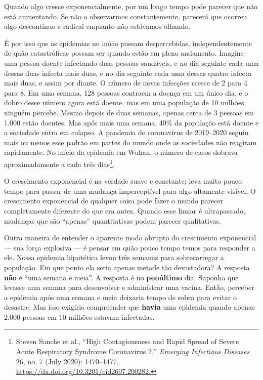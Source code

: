 Quando algo cresce exponencialmente, por um longo tempo pode parecer que não 
está aumentando. Se não o observarmos constantemente, parecerá que ocorreu algo
descontínuo e radical enquanto não estávamos olhando.

É por isso que as epidemias no início passam despercebidas, independentemente de
quão catastróficas possam ser quando estão em pleno andamento. Imagine uma
pessoa doente infectando duas pessoas saudáveis, e no dia seguinte cada uma
dessas duas infecta mais duas, e no dia seguinte cada uma dessas quatro infecta 
mais duas, e assim por diante. O número de novas infecções cresce de 2 para 4 
para 8. Em uma semana, 128 pessoas contraem a doença em um único dia, e o dobro 
desse número agora está doente, mas em uma população de 10 milhões, ninguém 
percebe. Mesmo depois de duas semanas, apenas cerca de 3 pessoas em 1.000 estão 
doentes. Mas após mais uma semana, 40\% da população está doente e a sociedade 
entra em colapso. A pandemia de coronavírus de 2019--2020 seguiu mais ou menos 
esse padrão em partes do mundo onde as sociedades não reagiram rapidamente. No 
início da epidemia em Wuhan, o número de casos dobrava aproximadamente a cada 
três dias\footnote{Steven Sanche et al., ``High Contagiousness and Rapid Spread
of Severe Acute Respiratory Syndrome Coronavirus 2,'' \textit{Emerging
Infectious Diseases} 26, no. 7 (July 2020): 1470--1477,
\url{https://dx.doi.org/10.3201/eid2607.200282.}}.

O crescimento exponencial é na verdade suave e constante; leva muito pouco 
tempo para passar de uma mudança imperceptível para algo altamente visível. O 
crescimento exponencial de qualquer coisa pode fazer o mundo parecer 
completamente diferente do que era antes. Quando esse limiar é ultrapassado, 
mudanças que são ``apenas'' quantitativas podem parecer qualitativas.

Outra maneira de entender o aparente modo abrupto do crescimento exponencial ---
sua força explosiva --- é pensar em quão pouco tempo temos para responder a ele.
Nossa epidemia hipotética levou três semanas para sobrecarregar a população. Em 
que ponto ela seria apenas metade tão devastadora? A resposta \textbf{não} é
``uma semana e meia''. A resposta é no \textbf{penúltimo} dia. Suponha que
levasse uma semana para desenvolver e administrar uma vacina. Então, perceber a
epidemia após uma semana e meia deixaria tempo de sobra para evitar o
desastre. Mas isso exigiria compreender que \textbf{havia} uma epidemia quando
apenas 2.000 pessoas em 10 milhões estavam infectadas.

